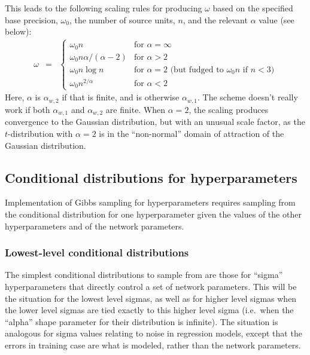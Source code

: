 \documentclass{report}[11pt]
\def\beq{\begin{eqnarray}}
\def\eeq{\end{eqnarray}}
\begin{document}
This leads to the following scaling rules for producing $\omega$ based 
on the specified base precision, $\omega_0$, the number of source units, $n$,
and the relevant $\alpha$ value (see below):\beq
  \omega & = & \left\{\begin{array}{ll}
     \omega_0 n                         & \mbox{for $\alpha=\infty$} \\[2pt]
     \omega_0 n \alpha / (\alpha\!-\!2) & \mbox{for $\alpha>2$} \\[2pt]
     \omega_0 n \log n                  & \mbox{for $\alpha=2$ 
        \ \ (but fudged to $\omega_0 n$ if $n<3$)} \\[2pt]
     \omega_0 n^{2/\alpha}              & \mbox{for $\alpha<2$} 
  \end{array}\right.
\eeq%
Here, $\alpha$ is $\alpha_{w,2}$ if that is finite, and is otherwise
$\alpha_{w,1}$.  The scheme doesn't really work if both $\alpha_{w,1}$
and $\alpha_{w,2}$ are finite.  When $\alpha=2$, the scaling produces
convergence to the Gaussian distribution, but with an unusual scale
factor, as the $t$-distribution with $\alpha=2$ is in the
``non-normal'' domain of attraction of the Gaussian distribution.


\subsection*{Conditional distributions for hyperparameters}

Implementation of Gibbs sampling for hyperparameters requires sampling
from the conditional distribution for one hyperparameter given the
values of the other hyperparameters and of the network parameters.


\subsubsection*{Lowest-level conditional distributions}

The simplest conditional distributions to sample from are those for 
``sigma'' hyperparameters that directly control a set of network
parameters.  This will be the situation for the lowest level
sigmas, as well as for higher level sigmas when the lower level sigmas
are tied exactly to this higher level sigma (i.e.\ when the ``alpha''
shape parameter for their distribution is infinite).  The situation is
analogous for sigma values relating to noise in regression models,
except that the errors in training case are what is modeled, rather
than the network parameters.
\end{document}
